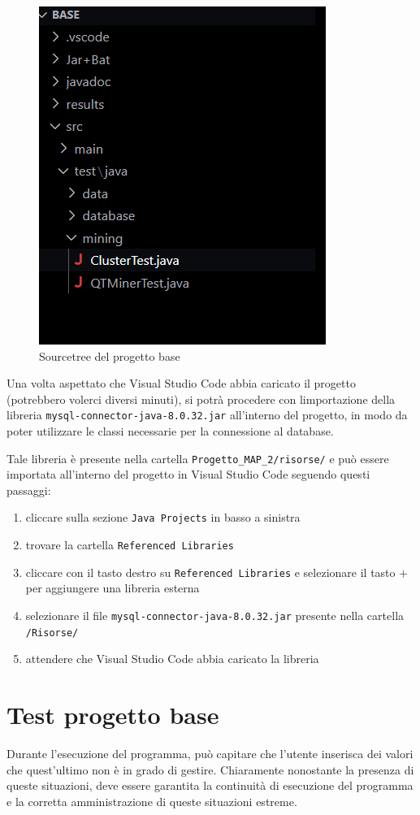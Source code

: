 \begin{figure}[h!]
    \centering
    \includegraphics[width = 0.35 \textwidth]{images/albero cartelle.png}
    \caption{Sourcetree del progetto base}
\end{figure}
Una volta aspettato che Visual Studio Code abbia caricato il progetto (potrebbero volerci diversi minuti), si potrà procedere con limportazione della libreria \texttt{mysql-connector-java-8.0.32.jar} all'interno del progetto, in modo da poter utilizzare le classi necessarie per la connessione al database.

Tale libreria è presente nella cartella \texttt{Progetto\_MAP\_2/risorse/} e può essere importata all'interno del progetto in Visual Studio Code seguendo questi passaggi:

\begin{enumerate}
    \item cliccare sulla sezione \texttt{Java Projects} in basso a sinistra
    \item trovare la cartella \texttt{Referenced Libraries}
    \item cliccare con il tasto destro su \texttt{Referenced Libraries} e selezionare il tasto $+$ per aggiungere una libreria esterna
    \item selezionare il file \texttt{mysql-connector-java-8.0.32.jar} presente nella cartella \texttt{/Risorse/}
    \item attendere che Visual Studio Code abbia caricato la libreria
\end{enumerate}
\section{Test progetto base}

Durante l'esecuzione del programma, può capitare che l'utente inserisca dei valori che quest'ultimo non è in grado di gestire. Chiaramente nonostante la presenza di queste situazioni, deve essere garantita la continuità di esecuzione del programma e la corretta amministrazione di queste situazioni estreme.

